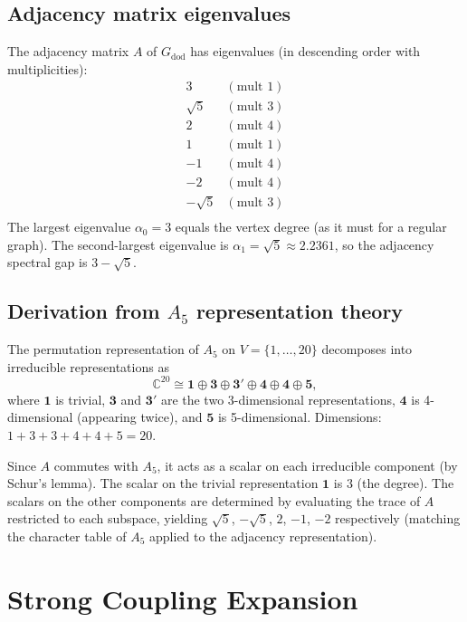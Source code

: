 \documentclass[12pt,a4paper]{article}
\theoremstyle{definition}
\theoremstyle{remark}
\newcommand{\C}{\mathbb{C}}
\begin{document}
\subsection{Adjacency matrix eigenvalues}

The adjacency matrix $A$ of $G_{\mathrm{dod}}$ has eigenvalues
(in descending order with multiplicities):
\[
\begin{array}{rl}
  3         & (\text{mult } 1) \\
  \sqrt{5}  & (\text{mult } 3) \\
  2         & (\text{mult } 4) \\
  1         & (\text{mult } 1) \\
  -1        & (\text{mult } 4) \\
  -2        & (\text{mult } 4) \\
  -\sqrt{5} & (\text{mult } 3) \\
\end{array}
\]
The largest eigenvalue $\alpha_0 = 3$ equals the vertex degree (as it
must for a regular graph).  The second-largest eigenvalue is
$\alpha_1 = \sqrt{5} \approx 2.2361$, so the adjacency spectral gap is
$3 - \sqrt{5}$.

\subsection{Derivation from $A_5$ representation theory}

The permutation representation of $A_5$ on $V = \{1,\ldots,20\}$
decomposes into irreducible representations as
\[
  \C^{20} \cong \mathbf{1} \oplus \mathbf{3} \oplus \mathbf{3'}
  \oplus \mathbf{4} \oplus \mathbf{4} \oplus \mathbf{5},
\]
where $\mathbf{1}$ is trivial, $\mathbf{3}$ and $\mathbf{3'}$ are the
two 3-dimensional representations, $\mathbf{4}$ is 4-dimensional
(appearing twice), and $\mathbf{5}$ is 5-dimensional.  Dimensions:
$1 + 3 + 3 + 4 + 4 + 5 = 20$.

Since $A$ commutes with $A_5$, it acts as a scalar on each irreducible
component (by Schur's lemma).  The scalar on the trivial representation
$\mathbf{1}$ is $3$ (the degree).  The scalars on the other components
are determined by evaluating the trace of $A$ restricted to each
subspace, yielding $\sqrt{5}$, $-\sqrt{5}$, $2$, $-1$, $-2$
respectively (matching the character table of $A_5$ applied to the
adjacency representation).

\section{Strong Coupling Expansion}\label{app:strong}
\end{document}
